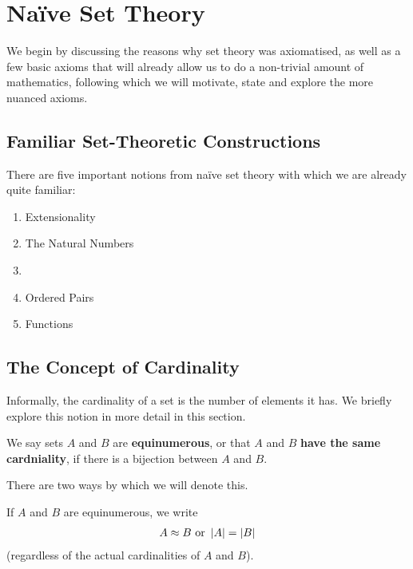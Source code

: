\section{Naïve Set Theory}

We begin by discussing the reasons why set theory was axiomatised, as well as a few basic axioms that will already allow us to do a non-trivial amount of mathematics, following which we will motivate, state and explore the more nuanced axioms.

\subsection{Familiar Set-Theoretic Constructions}

There are five important notions from naïve set theory with which we are already quite familiar:
\begin{enumerate}
    \item Extensionality
    \item The Natural Numbers
    \item \sorry %
    \item Ordered Pairs
    \item Functions
\end{enumerate}






\subsection{The Concept of Cardinality}

Informally, the cardinality of a set is the number of elements it has. We briefly explore this notion in more detail in this section.

\begin{boxdefinition}[Equinumerosity]
    We say sets $A$ and $B$ are \textbf{equinumerous}, or that $A$ and $B$ \textbf{have the same cardniality}, if there is a bijection between $A$ and $B$.
\end{boxdefinition}

There are two ways by which we will denote this.

\begin{boxconvention}
    If $A$ and $B$ are equinumerous, we write
    \begin{align*}
        A \approx B \text{ or } \left\lvert A \right\rvert = \left\lvert B \right\rvert
    \end{align*}
    (regardless of the actual cardinalities of $A$ and $B$).
\end{boxconvention}

